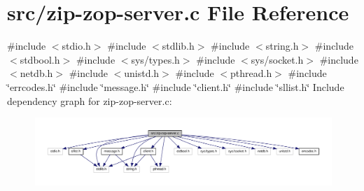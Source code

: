 \hypertarget{zip-zop-server_8c}{}\section{src/zip-\/zop-\/server.c File Reference}
\label{zip-zop-server_8c}
{\ttfamily \#include $<$stdio.\+h$>$}\newline
{\ttfamily \#include $<$stdlib.\+h$>$}\newline
{\ttfamily \#include $<$string.\+h$>$}\newline
{\ttfamily \#include $<$stdbool.\+h$>$}\newline
{\ttfamily \#include $<$sys/types.\+h$>$}\newline
{\ttfamily \#include $<$sys/socket.\+h$>$}\newline
{\ttfamily \#include $<$netdb.\+h$>$}\newline
{\ttfamily \#include $<$unistd.\+h$>$}\newline
{\ttfamily \#include $<$pthread.\+h$>$}\newline
{\ttfamily \#include \char`\"{}errcodes.\+h\char`\"{}}\newline
{\ttfamily \#include \char`\"{}message.\+h\char`\"{}}\newline
{\ttfamily \#include \char`\"{}client.\+h\char`\"{}}\newline
{\ttfamily \#include \char`\"{}sllist.\+h\char`\"{}}\newline
Include dependency graph for zip-\/zop-\/server.c\+:\nopagebreak
\begin{figure}[H]
\begin{center}
\leavevmode
\includegraphics[width=350pt]{zip-zop-server_8c__incl}
\end{center}
\end{figure}

